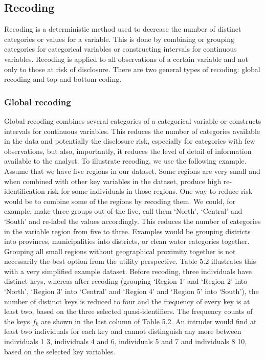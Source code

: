 \documentclass[letterpaper,10pt,english]{sphinxmanual}
\begin{document}
\subsection{Recoding}
\label{\detokenize{anon_methods:recoding}}
Recoding is a deterministic method used to decrease the number of
distinct categories or values for a variable. This is done by combining
or grouping categories for categorical variables or constructing
intervals for continuous variables. Recoding is applied to all
observations of a certain variable and not only to those at risk of
disclosure. There are two general types of recoding: global recoding and
top and bottom coding.


\subsubsection{Global recoding}
\label{\detokenize{anon_methods:global-recoding}}
Global recoding combines several categories of a categorical variable or
constructs intervals for continuous variables. This reduces the number
of categories available in the data and potentially the disclosure risk,
especially for categories with few observations, but also, importantly,
it reduces the level of detail of information available to the analyst.
To illustrate recoding, we use the following example. Assume that we
have five regions in our dataset. Some regions are very small and when
combined with other key variables in the dataset, produce high
re-identification risk for some individuals in those regions. One way to
reduce risk would be to combine some of the regions by recoding them. We
could, for example, make three groups out of the five, call them
‘North’, ‘Central’ and ‘South’ and re-label the values accordingly. This
reduces the number of categories in the variable region from five to
three.  Examples would be grouping districts
into provinces, municipalities into districts, or clean water categories
together. Grouping all small regions without geographical proximity
together is not necessarily the best option from the utility
perspective. Table 5.2 illustrates this with a very simplified example
dataset. Before recoding, three individuals have distinct keys, whereas
after recoding (grouping ‘Region 1’ and ‘Region 2’ into ‘North’, ‘Region
3’ into ‘Central’ and ‘Region 4’ and ‘Region 5’ into ‘South’), the
number of distinct keys is reduced to four and the frequency of every
key is at least two, based on the three selected quasi-identifiers. The
frequency counts of the keys \(f_{k}\) are shown in the last column
of Table 5.2. An intruder would find at least two individuals for each
key and cannot distinguish any more between individuals 1 \textendash{} 3,
individuals 4 and 6, individuals 5 and 7 and individuals 8 \textendash{} 10, based
on the selected key variables.
\end{document}
